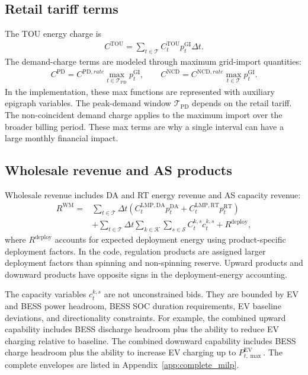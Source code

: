 \documentclass[final,5p,times]{elsarticle}
\newcommand{\DeltaT}{\Delta t}
\newcommand{\EV}{\mathrm{EV}}
\newcommand{\DA}{\mathrm{DA}}
\newcommand{\RT}{\mathrm{RT}}
\newcommand{\GI}{\mathrm{GI}}
\newcommand{\TOU}{\mathrm{TOU}}
\newcommand{\PD}{\mathrm{PD}}
\newcommand{\NCD}{\mathrm{NCD}}
\newcommand{\WM}{\mathrm{WM}}
\newcommand{\calT}{\mathcal{T}}
\newcommand{\calK}{\mathcal{K}}
\newcommand{\calS}{\mathcal{S}}
\begin{document}
\subsection{Retail tariff terms}
The TOU energy charge is
\begin{align}
C^{\TOU}=\sum_{t\in\calT} C_t^{\TOU}p_t^{\GI}\DeltaT.
\label{eq:tou_main}
\end{align}
The demand-charge terms are modeled through maximum grid-import quantities:
\begin{align}
C^{\PD}=C^{\PD,rate}\max_{t\in\calT_{\PD}} p_t^{\GI},\qquad
C^{\NCD}=C^{\NCD,rate}\max_{t\in\calT}p_t^{\GI}.
\label{eq:demand_charge_main}
\end{align}
In the implementation, these max functions are represented with auxiliary epigraph variables. The peak-demand window $\calT_{\PD}$ depends on the retail tariff. The non-coincident demand charge applies to the maximum import over the broader billing period. These max terms are why a single interval can have a large monthly financial impact.

\subsection{Wholesale revenue and AS products}
Wholesale revenue includes DA and RT energy revenue and AS capacity revenue:
\begin{align}
R^{\WM}=&\sum_{t\in\calT}\DeltaT\left(C_t^{\mathrm{LMP},\DA}p_t^{\DA}+C_t^{\mathrm{LMP},\RT}p_t^{\RT}\right)\nonumber\\
&+\sum_{t\in\calT}\DeltaT\sum_{k\in\calK}\sum_{s\in\calS} C_t^{k,s}c_t^{k,s} + R^{\mathrm{deploy}},
\label{eq:wm_revenue_main}
\end{align}
where $R^{\mathrm{deploy}}$ accounts for expected deployment energy using product-specific deployment factors. In the code, regulation products are assigned larger deployment factors than spinning and non-spinning reserve. Upward products and downward products have opposite signs in the deployment-energy accounting.

The capacity variables $c_t^{k,s}$ are not unconstrained bids. They are bounded by EV and BESS power headroom, BESS SOC duration requirements, EV baseline deviations, and directionality constraints. For example, the combined upward capability includes BESS discharge headroom plus the ability to reduce EV charging relative to baseline. The combined downward capability includes BESS charge headroom plus the ability to increase EV charging up to $P_{t,\max}^{\EV}$. The complete envelopes are listed in Appendix~\ref{app:complete_milp}.
\end{document}
